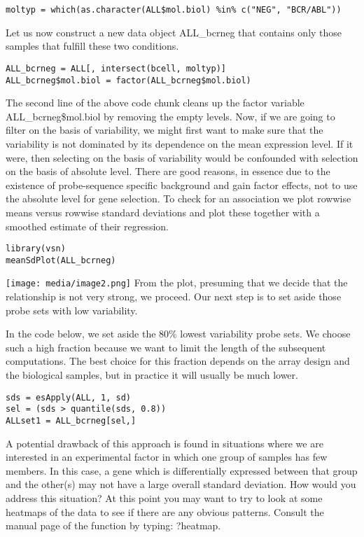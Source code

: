 \begin{verbatim}
moltyp = which(as.character(ALL$mol.biol) %in% c("NEG", "BCR/ABL"))
\end{verbatim}

Let us now construct a new data object ALL\_bcrneg that contains only
those samples that fulfill these two conditions.

\begin{verbatim}
ALL_bcrneg = ALL[, intersect(bcell, moltyp)]
ALL_bcrneg$mol.biol = factor(ALL_bcrneg$mol.biol)
\end{verbatim}

The second line of the above code chunk cleans up the factor variable
ALL\_bcrneg\$mol.biol by removing the empty levels. Now, if we are going
to filter on the basis of variability, we might first want to make sure
that the variability is not dominated by its dependence on the mean
expression level. If it were, then selecting on the basis of variability
would be confounded with selection on the basis of absolute level. There
are good reasons, in essence due to the existence of probe-sequence
specific background and gain factor effects, not to use the absolute
level for gene selection. To check for an association we plot rowwise
means versus rowwise standard deviations and plot these together with a
smoothed estimate of their regression.

\begin{verbatim}
library(vsn)
meanSdPlot(ALL_bcrneg)
\end{verbatim}

\texttt{[image: media/image2.png]}
From the plot, presuming that we decide that the relationship is not
very strong, we proceed. Our next step is to set aside those probe sets
with low variability.

In the code below, we set aside the 80\% lowest variability probe sets.
We choose such a high fraction because we want to limit the length of
the subsequent computations. The best choice for this fraction depends
on the array design and the biological samples, but in practice it will
usually be much lower.

\begin{verbatim}
sds = esApply(ALL, 1, sd)
sel = (sds > quantile(sds, 0.8))
ALLset1 = ALL_bcrneg[sel,]
\end{verbatim}

A potential drawback of this approach is found in situations where we
are interested in an experimental factor in which one group of samples
has few members. In this case, a gene which is differentially expressed
between that group and the other(s) may not have a large overall
standard deviation. How would you address this situation? At this point
you may want to try to look at some heatmaps of the data to see if there
are any obvious patterns. Consult the manual page of the function by
typing: ?heatmap.

